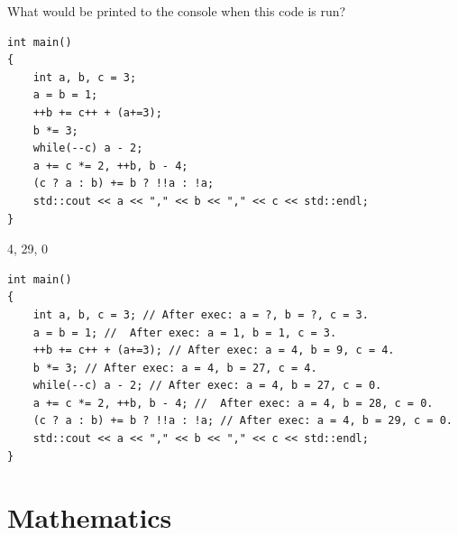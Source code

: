 \documentclass{exam}%
\newcommand*{\ANCOAMATH}{}%
\begin{document}
\begin{questions}
\question What would be printed to the console when this code is run?
\begin{lstlisting}
int main()
{
    int a, b, c = 3;
    a = b = 1;
    ++b += c++ + (a+=3);
    b *= 3;
    while(--c) a - 2;
    a += c *= 2, ++b, b - 4;
    (c ? a : b) += b ? !!a : !a;
    std::cout << a << "," << b << "," << c << std::endl;
}
\end{lstlisting}
\begin{solution}[.2in]
4, 29, 0
\begin{lstlisting}
int main()
{
    int a, b, c = 3; // After exec: a = ?, b = ?, c = 3.
    a = b = 1; //  After exec: a = 1, b = 1, c = 3.
    ++b += c++ + (a+=3); // After exec: a = 4, b = 9, c = 4.
    b *= 3; // After exec: a = 4, b = 27, c = 4.
    while(--c) a - 2; // After exec: a = 4, b = 27, c = 0.
    a += c *= 2, ++b, b - 4; //  After exec: a = 4, b = 28, c = 0.
    (c ? a : b) += b ? !!a : !a; // After exec: a = 4, b = 29, c = 0.
    std::cout << a << "," << b << "," << c << std::endl;
}
\end{lstlisting}
\end{solution}

\end{questions}
\fi
\ifdefined\ANCOAMATH
\newpage
\section{Mathematics}
\end{document}
